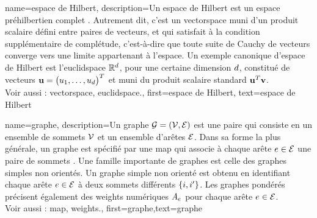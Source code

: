 {name={espace de Hilbert},
	description={Un espace de Hilbert est un espace préhilbertien complet \cite{introhilbertbook}. 
		Autrement dit, c’est un \gls{vectorspace} muni d’un produit scalaire défini entre paires de vecteurs, 
		et qui satisfait à la condition supplémentaire de complétude, c’est-à-dire que toute suite de Cauchy de vecteurs 
		converge vers une limite appartenant à l’espace. Un exemple canonique d’espace de Hilbert est l’\gls{euclidspace} 
		$\mathbb{R}^{d}$, pour une certaine dimension $d$, constitué de vecteurs 
		${\bf u} = \big(u_1, \ldots, u_{d}\big)^T$ et muni du produit scalaire standard ${\bf u}^T {\bf v}$.
		\\
		Voir aussi : \gls{vectorspace}, \gls{euclidspace}.},
	first={espace de Hilbert},
	text={espace de Hilbert}
}

{name={graphe},
	description={Un graphe $\mathcal{G} = \left( \mathcal{V},\mathcal{E} \right)$ est une paire qui consiste en un ensemble de sommets $\mathcal{V}$ et un ensemble d’arêtes $\mathcal{E}$. Dans sa forme la plus générale, un graphe est spécifié par une \gls{map} qui associe à chaque arête $e \in \mathcal{E}$ une paire de sommets \cite{RockNetworks}. Une famille importante de graphes est celle des graphes simples non orientés. Un graphe simple non orienté est obtenu en identifiant chaque arête $e \in \mathcal{E}$ à deux sommets différents $\{i,i'\}$. Les graphes pondérés précisent également des \gls{weights} numériques $A_{e}$ pour chaque arête $e \in \mathcal{E}$.
		\\
		Voir aussi : \gls{map}, \gls{weights}.},
	first={graphe},text={graphe}
}



